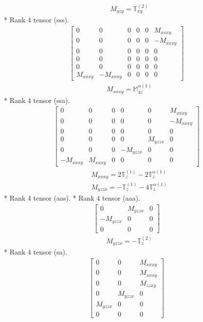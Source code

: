 \documentclass[fleqn,8pt,landscape]{jsarticle}
\begin{document}
\begin{align*}
& M_{yzy} = \mathbb{T}_{xy}^{(2)}
\end{align*}
* Rank 4 tensor (sss).
\begin{align*}
\begin{bmatrix} 0 & 0 & 0 & 0 & 0 & M_{xxxy} \\ 0 & 0 & 0 & 0 & 0 & - M_{xxxy} \\ 0 & 0 & 0 & 0 & 0 & 0 \\ 0 & 0 & 0 & 0 & 0 & 0 \\ 0 & 0 & 0 & 0 & 0 & 0 \\ M_{xxxy} & - M_{xxxy} & 0 & 0 & 0 & 0 \end{bmatrix}
\end{align*}
\begin{align*}
& M_{xxxy} = \mathbb{M}_{4z}^{\alpha(1)}
\end{align*}
* Rank 4 tensor (ssa).
\begin{align*}
\begin{bmatrix} 0 & 0 & 0 & 0 & 0 & M_{xxxy} \\ 0 & 0 & 0 & 0 & 0 & - M_{xxxy} \\ 0 & 0 & 0 & 0 & 0 & 0 \\ 0 & 0 & 0 & 0 & M_{yzzx} & 0 \\ 0 & 0 & 0 & - M_{yzzx} & 0 & 0 \\ - M_{xxxy} & M_{xxxy} & 0 & 0 & 0 & 0 \end{bmatrix}
\end{align*}
\begin{align*}
& M_{xxxy} = 2 \mathbb{T}_{z}^{(1)} - 2 \mathbb{T}_{z}^{\alpha(1)} \\
& M_{yzzx} = - \mathbb{T}_{z}^{(1)} - 4 \mathbb{T}_{z}^{\alpha(1)}
\end{align*}
* Rank 4 tensor (aas).
* Rank 4 tensor (aaa).
\begin{align*}
\begin{bmatrix} 0 & M_{yzzx} & 0 \\ - M_{yzzx} & 0 & 0 \\ 0 & 0 & 0 \end{bmatrix}
\end{align*}
\begin{align*}
& M_{yzzx} = - \mathbb{T}_{z}^{(2)}
\end{align*}
* Rank 4 tensor (sa).
\begin{align*}
\begin{bmatrix} 0 & 0 & M_{xxxy} \\ 0 & 0 & M_{xxxy} \\ 0 & 0 & M_{zzxy} \\ 0 & M_{yzzx} & 0 \\ M_{yzzx} & 0 & 0 \\ 0 & 0 & 0 \end{bmatrix}
\end{align*}
\end{document}
